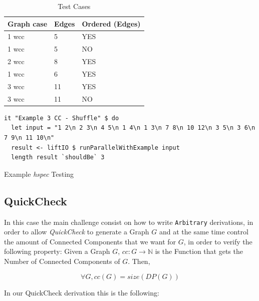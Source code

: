 \documentclass[preprint]{elsarticle}
\begin{document}
\begin{table}[H]
  \centering
  \begin{tabular}{|l|l|l|}
   \hline
   Graph case & Edges & Ordered (Edges)\\
   \hline
   1 \acrshort{wcc} & 5 & YES \\
   \hline
   1 \acrshort{wcc} & 5 & NO \\
   \hline
   2 \acrshort{wcc} & 8 & YES \\
   \hline
   1 \acrshort{wcc} & 6 & YES \\
   \hline
   3 \acrshort{wcc} & 11 & YES \\
   \hline
   3 \acrshort{wcc} & 11 & NO \\
   \hline
  \end{tabular}
 \caption{Test Cases}
 \label{table:apx:1}
 \end{table}

\begin{listing}[H]
\begin{verbatim}      
it "Example 3 CC - Shuffle" $ do
  let input = "1 2\n 2 3\n 4 5\n 1 4\n 1 3\n 7 8\n 10 12\n 3 5\n 3 6\n 7 9\n 11 10\n"
  result <- liftIO $ runParallelWithExample input
  length result `shouldBe` 3
\end{verbatim}
\caption{Example \textit{hspec} Testing}
\label{src:haskell:6}
\end{listing}

\subsection{QuickCheck}
In this case the main challenge consist on how to write \texttt{Arbitrary} derivations, in order to 
allow \textit{QuickCheck} to generate a Graph $G$ and at the same time control the amount of Connected Components that we want for $G$, 
in order to verify the following property: Given a Graph $G$, $cc : G \to \mathbb{N}$ is the Function that gets the Number of Connected Components of $G$.
Then,

\begin{equation}
  \forall G, cc(G) = size(DP(G))
\end{equation}

In our QuickCheck derivation this is the following:
\end{document}
